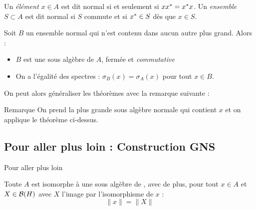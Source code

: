 \documentclass[11pt, xcolor=table]{beamer}
\begin{document}
\begin{frame}
    \begin{mydef}
        Un \emph{élément} $x \in A$ est dit normal si et seulement si $xx^\ast = x^\ast x $. Un \emph{ensemble} $ S \subset A $ est dit
        normal si $S$ commute et si $x^\ast \in S$ dès que $x \in S$.  
    \end{mydef}

    \begin{myth}
        Soit $B$ un ensemble normal qui n'est contenu dans aucun autre plus grand. Alors :
        \begin{itemize}
            \item $B$ est une sous algèbre de $A$, fermée et \emph{commutative}
            \item On a l'égalité des spectres : $\sigma_{B}(x) = \sigma_{A}(x) $ pour tout $x \in B$.
        \end{itemize}
    \end{myth}

    On peut alors généraliser les théorèmes avec la remarque suivante :
    \begin{block}{Remarque}
        On prend la plus grande sous algèbre normale qui contient $x$ et on applique le théorème ci-dessus.
    \end{block}
\end{frame}

\subsection{Pour aller plus loin : Construction GNS}

\begin{frame}{Pour aller plus loin}

    \begin{myth}
        Toute \Calg $A$ est isomorphe à une sous algèbre de \Bh, avec de plus, pour tout $x \in A$ et $X \in \mathcal{B}(H)$ avec $X$ l'image
        par l'isomorphisme de $x$ :
        \[
            \| x \| = \| X \|
        \]
    \end{myth}
\end{frame}


\end{document}
